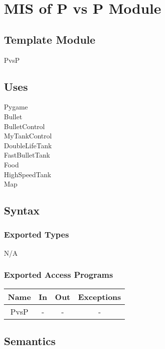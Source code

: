 \documentclass[12pt, titlepage]{article}
\begin{document}
\section{MIS of P vs P Module}
        \subsection{Template Module}
        PvsP
        \subsection{Uses}
        Pygame\\
        Bullet \\
        BulletControl \\
        MyTankControl \\
        DoubleLifeTank \\
        FastBulletTank \\
        Food \\
        HighSpeedTank \\
        Map\\
		\subsection{Syntax}
		\subsubsection{Exported Types}
		N/A
		\subsubsection{Exported Access Programs}
				\begin{tabular}[pos]{|c|c|c|c|}
					
					\hline
					\textbf{Name}& \textbf{In} & \textbf{Out} & \textbf{Exceptions} \\ \hline
					PvsP & - & - & - \\ \hline
			    \end{tabular}

		
		\subsection{Semantics}
\end{document}
